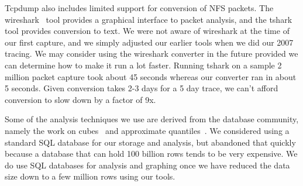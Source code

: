 Tcpdump also includes limited support for conversion of NFS packets.
The wireshark~\cite{wireshark} tool provides a graphical interface to
packet analysis, and the tshark tool provides conversion to text.  We
were not aware of wireshark at the time of our first capture, and we
simply adjusted our earlier tools when we did our 2007 tracing.  We
may consider using the wireshark converter in the future provided we
can determine how to make it run a lot faster.  Running tshark on a
sample 2 million packet capture took about 45 seconds whereas our
converter ran in about 5 seconds.  Given conversion takes 2-3 days for
a 5 day trace, we can't afford conversion to slow down by a factor of
9x.

Some of the analysis techniques we use are derived from the database
community, namely the work on cubes~\cite{gray97cube} and approximate
quantiles~\cite{Manku98approximatemedians}.  We considered using a
standard SQL database for our storage and analysis, but abandoned that
quickly because a database that can hold 100 billion rows tends to be
very expensive.  We do use SQL databases for analysis and graphing
once we have reduced the data size down to a few million rows using
our tools.




